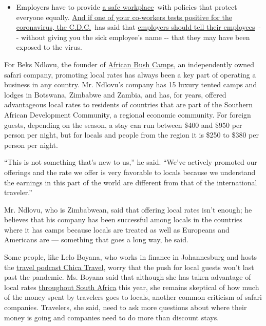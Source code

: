 \begin{itemize}
  \begin{itemize}
  \tightlist
  \item
    Employers have to provide
    \href{https://www.osha.gov/SLTC/covid-19/standards.html}{a safe
    workplace}~with policies that protect everyone equally.
    \href{https://www.nytimes3xbfgragh.onion/article/coronavirus-money-unemployment.html?action=click\&pgtype=Article\&state=default\&region=MAIN_CONTENT_3\&context=storylines_faq}{And
    if one of your co-workers tests positive for the coronavirus, the
    C.D.C.}~has said that
    \href{https://www.cdc.gov/coronavirus/2019-ncov/community/guidance-business-response.html}{employers
    should tell their employees}~-\/- without giving you the sick
    employee's name -\/- that they may have been exposed to the virus.
  \end{itemize}
\end{itemize}

For Beks Ndlovu, the founder of
\href{https://africanbushcamps.com/}{African Bush Camps}, an
independently owned safari company, promoting local rates has always
been a key part of operating a business in any country. Mr. Ndlovu's
company has 15 luxury tented camps and lodges in Botswana, Zimbabwe and
Zambia, and has, for years, offered advantageous local rates to
residents of countries that are part of the Southern African Development
Community, a regional economic community. For foreign guests, depending
on the season, a stay can run between \$400 and \$950 per person per
night, but for locals and people from the region it is \$250 to \$380
per person per night.

``This is not something that's new to us,'' he said. ``We've actively
promoted our offerings and the rate we offer is very favorable to locals
because we understand the earnings in this part of the world are
different from that of the international traveler.''

Mr. Ndlovu, who is Zimbabwean, said that offering local rates isn't
enough; he believes that his company has been successful among locals in
the countries where it has camps because locals are treated as well as
Europeans and Americans are --- something that goes a long way, he said.

Some people, like Lelo Boyana, who works in finance in Johannesburg and
hosts the \href{https://chicatravel.co.za/}{travel podcast Chica
Travel}, worry that the push for local guests won't last past the
pandemic. Ms. Boyana said that although she has taken advantage of local
rates
\href{https://www.reuters.com/article/us-health-coronavirus-safrica-tourism/with-borders-closed-south-africa-pins-hopes-on-cash-strapped-local-tourists-idUSKBN25R1LI}{throughout
South Africa} this year, she remains skeptical of how much of the money
spent by travelers goes to locals, another common criticism of safari
companies. Travelers, she said, need to ask more questions about where
their money is going and companies need to do more than discount stays.

